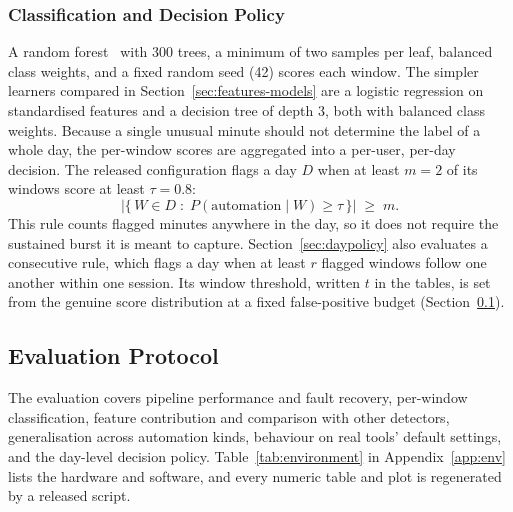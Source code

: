 \documentclass[sensors,article,submit,pdftex,oneauthor]{Definitions/mdpi}
\begin{document}
\subsubsection{Classification and Decision Policy}
A random forest~\cite{breiman2001random, pedregosa2011scikit} with 300 trees, a minimum of two samples per leaf, balanced class weights, and a fixed random seed (42) scores each window. The simpler learners compared in Section~\ref{sec:features-models} are a logistic regression on standardised features and a decision tree of depth 3, both with balanced class weights. Because a single unusual minute should not determine the label of a whole day, the per-window scores are aggregated into a per-user, per-day decision. The released configuration flags a day $D$ when at least $m = 2$ of its windows score at least $\tau = 0.8$:
\begin{equation}
\bigl|\{\, W \in D \;:\; P(\text{automation} \mid W) \geq \tau \,\}\bigr| \;\geq\; m .
\label{eq:dayflag}
\end{equation}
This rule counts flagged minutes anywhere in the day, so it does not require the sustained burst it is meant to capture. Section~\ref{sec:daypolicy} also evaluates a consecutive rule, which flags a day when at least $r$ flagged windows follow one another within one session. Its window threshold, written $t$ in the tables, is set from the genuine score distribution at a fixed false-positive budget (Section~\ref{sec:protocol}).

\subsection{Evaluation Protocol}
\label{sec:protocol}

The evaluation covers pipeline performance and fault recovery, per-window classification, feature contribution and comparison with other detectors, generalisation across automation kinds, behaviour on real tools' default settings, and the day-level decision policy. Table~\ref{tab:environment} in Appendix~\ref{app:env} lists the hardware and software, and every numeric table and plot is regenerated by a released script.
\end{document}
